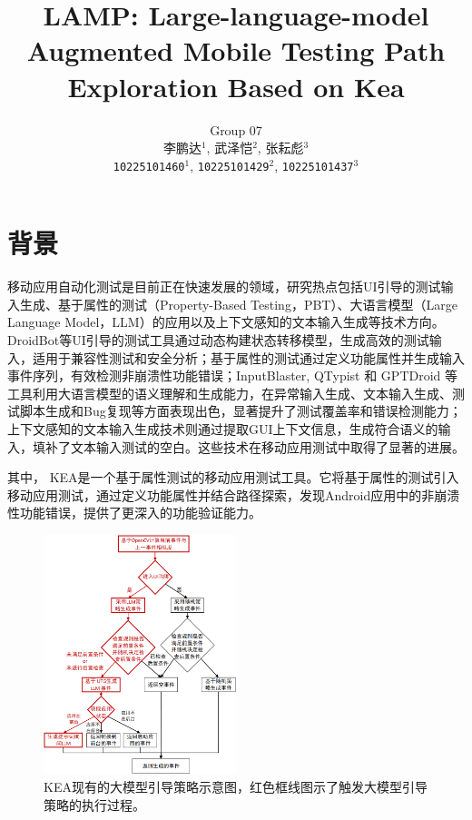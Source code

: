 \documentclass[twocolumn, 10pt]{article}
\title{\fontspec{Times New Roman} LAMP: Large-language-model Augmented Mobile Testing Path Exploration Based on Kea}
\author{
  Group 07\\
  李鹏达$^{1}$, 武泽恺$^{2}$, 张耘彪$^{3}$\\
  \texttt{10225101460}$^{1}$, 
  \texttt{10225101429}$^{2}$, 
  \texttt{10225101437}$^{3}$
}
\date{}
\newcommand{\figureBelowMargin}{\vspace{-2pt}}
\newcommand{\kea}{K{\small\MakeUppercase{ea}}}
\begin{document}
\maketitle

\section{背景}

移动应用自动化测试是目前正在快速发展的领域，研究热点包括UI引导的测试输入生成、基于属性的测试（Property-Based Testing，PBT）、大语言模型（Large Language Model，LLM）的应用以及上下文感知的文本输入生成等技术方向。DroidBot\cite{li2017droidbot}等UI引导的测试工具通过动态构建状态转移模型，生成高效的测试输入，适用于兼容性测试和安全分析；基于属性的测试\cite{xiong2024general}通过定义功能属性并生成输入事件序列，有效检测非崩溃性功能错误；InputBlaster\cite{liu2024testing}, QTypist\cite{liu2023fill} 和 GPTDroid\cite{liu2024make} 等工具利用大语言模型的语义理解和生成能力，在异常输入生成、文本输入生成、测试脚本生成和Bug复现等方面表现出色，显著提升了测试覆盖率和错误检测能力；上下文感知的文本输入生成技术\cite{liu2023fill}则通过提取GUI上下文信息，生成符合语义的输入，填补了文本输入测试的空白。这些技术在移动应用测试中取得了显著的进展。

其中， \kea\cite{xiong2024general}是一个基于属性测试的移动应用测试工具。它将基于属性的测试引入移动应用测试，通过定义功能属性并结合路径探索，发现Android应用中的非崩溃性功能错误，提供了更深入的功能验证能力。

\begin{figure}[ht!]
    \centering
    \includegraphics[width=0.5\textwidth]{llm}
    \caption{\kea 现有的大模型引导策略示意图，红色框线图示了触发大模型引导策略的执行过程。}
    \figureBelowMargin
    \label{fig:llm}
\end{figure}
\end{document}
